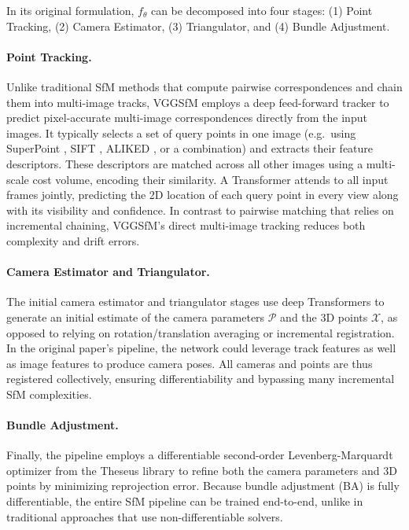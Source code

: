 In its original formulation, $f_\theta$ can be decomposed into four stages: (1) Point Tracking, (2) Camera Estimator, (3) Triangulator, and (4) Bundle Adjustment.

\paragraph{Point Tracking.}
Unlike traditional SfM methods that compute pairwise correspondences and chain them into multi-image tracks, VGGSfM employs a deep feed-forward tracker to predict pixel-accurate multi-image correspondences directly from the input images. 
It typically selects a set of query points in one image (e.g.\ using SuperPoint \cite{detone18superpoint}, SIFT \cite{Lowe2004DistinctiveIF}, ALIKED \cite{Zhao2023ALIKED}, or a combination) and extracts their feature descriptors. These descriptors are matched across all other images using a multi-scale cost volume, encoding their similarity. 
A Transformer attends to all input frames jointly, predicting the 2D location of each query point in every view along with its visibility and confidence. 
In contrast to pairwise matching that relies on incremental chaining, VGGSfM's direct multi-image tracking reduces both complexity and drift errors.

\paragraph{Camera Estimator and Triangulator.}
The initial camera estimator and triangulator stages use deep Transformers to generate an initial estimate of the camera parameters $\mathcal{P}$ and the 3D points $\mathcal{X}$, as opposed to relying on rotation/translation averaging or incremental registration. 
In the original paper's pipeline, the network could leverage track features as well as image features to produce camera poses. All cameras and points are thus registered collectively, ensuring differentiability and bypassing many incremental SfM complexities.

\paragraph{Bundle Adjustment.}
Finally, the pipeline employs a differentiable second-order Levenberg-Marquardt optimizer from the Theseus library \cite{pineda2022theseus} to refine both the camera parameters and 3D points by minimizing reprojection error. 
Because bundle adjustment (BA) is fully differentiable, the entire SfM pipeline can be trained end-to-end, unlike in traditional approaches that use non-differentiable solvers.

